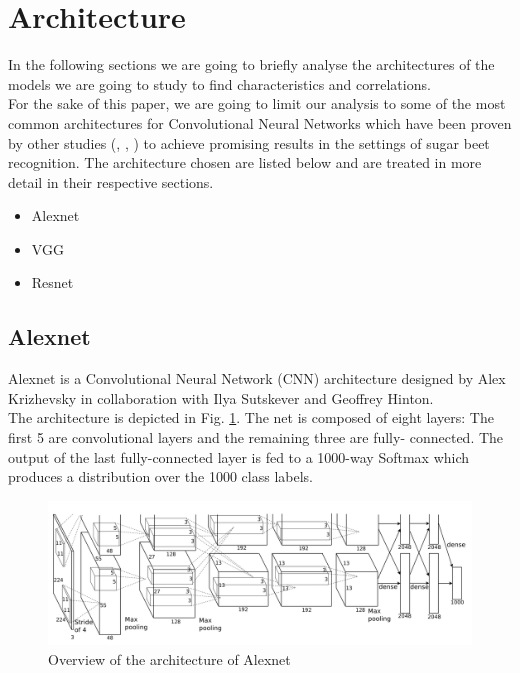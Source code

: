 \section{Architecture}\label{sec:arch}
In the following sections we are going to briefly analyse the architectures of the models we are going to study to find characteristics and correlations. \\
For the sake of this paper, we are going to limit our analysis to some of the most common architectures for Convolutional Neural Networks which have been proven by other studies (\cite{suh_transfer_2018}, \cite{s20205893}, \cite{phdthesis}) to achieve promising results in the settings of sugar beet recognition. The architecture chosen are listed below and are treated in more detail in their respective sections. 
\begin{itemize}
\item Alexnet
\item VGG
\item Resnet
\end{itemize}
\subsection{Alexnet}\label{sec:Alexnet}
Alexnet is a Convolutional Neural Network (CNN) architecture designed by  Alex Krizhevsky in collaboration with Ilya Sutskever and Geoffrey Hinton. \cite{NIPS2012_c399862d}\\
The architecture is depicted in Fig. \ref{fig:alexnet_architecture}. The net is composed of eight layers:
The first 5 are convolutional layers and the remaining three are fully- connected. The output of the last fully-connected layer is fed to a 1000-way Softmax which produces a distribution over the 1000 class labels. \cite{NIPS2012_c399862d}\\
\begin{figure}[htb]
    \centering
    \includegraphics[scale = 0.4]{img/alexnet_architecture.png}
    \caption[Overview of the architecture of Alexnet]{Overview of the architecture of Alexnet \cite{NIPS2012_c399862d}}
    \label{fig:alexnet_architecture}
\end{figure}


